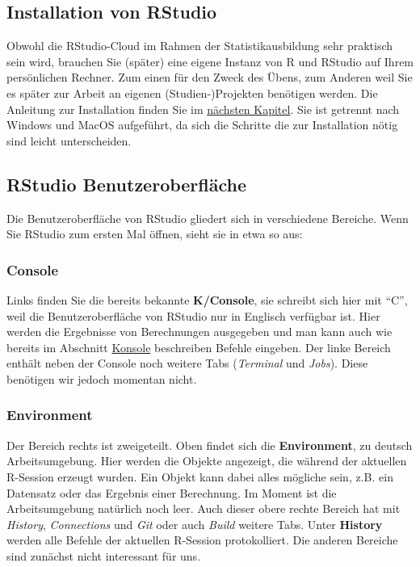 \documentclass[
]{book}
\begin{document}
\hypertarget{installation-von-rstudio}{%
\subsection{Installation von RStudio}\label{installation-von-rstudio}}

Obwohl die RStudio-Cloud im Rahmen der Statistikausbildung sehr praktisch sein wird, brauchen Sie (später) eine eigene Instanz von R und RStudio auf Ihrem persönlichen Rechner. Zum einen für den Zweck des Übens, zum Anderen weil Sie es später zur Arbeit an eigenen (Studien-)Projekten benötigen werden.
Die Anleitung zur Installation finden Sie im \protect\hyperlink{intallation}{nächsten Kapitel}.
Sie ist getrennt nach Windows und MacOS aufgeführt, da sich die Schritte die zur Installation nötig sind leicht unterscheiden.

\hypertarget{rstudio-benutzeroberfluxe4che}{%
\subsection{RStudio Benutzeroberfläche}\label{rstudio-benutzeroberfluxe4che}}

Die Benutzeroberfläche von RStudio gliedert sich in verschiedene Bereiche.
Wenn Sie RStudio zum ersten Mal öffnen, sieht sie in etwa so aus:

\hypertarget{console}{%
\subsubsection{Console}\label{console}}

Links finden Sie die bereits bekannte \textbf{K/Console}, sie schreibt sich hier mit ``C'', weil die Benutzeroberfläche von RStudio nur in Englisch verfügbar ist. Hier werden die Ergebnisse von Berechnungen ausgegeben und man kann auch wie bereits im Abschnitt \protect\hyperlink{konsole}{Konsole} beschreiben Befehle eingeben. Der linke Bereich enthält neben der Console noch weitere Tabs (\emph{Terminal} und \emph{Jobs}). Diese benötigen wir jedoch momentan nicht.

\hypertarget{environment}{%
\subsubsection{Environment}\label{environment}}

Der Bereich rechts ist zweigeteilt. Oben findet sich die \textbf{Environment}, zu deutsch Arbeitsumgebung.
Hier werden die Objekte angezeigt, die während der aktuellen R-Session erzeugt wurden. Ein Objekt kann dabei alles mögliche sein, z.B. ein Datensatz oder das Ergebnis einer Berechnung. Im Moment ist die Arbeitsumgebung natürlich noch leer. Auch dieser obere rechte Bereich hat mit \emph{History}, \emph{Connections} und \emph{Git} oder auch \emph{Build} weitere Tabs. Unter \textbf{History} werden alle Befehle der aktuellen R-Session protokolliert. Die anderen Bereiche sind zunächst nicht interessant für uns.
\end{document}
